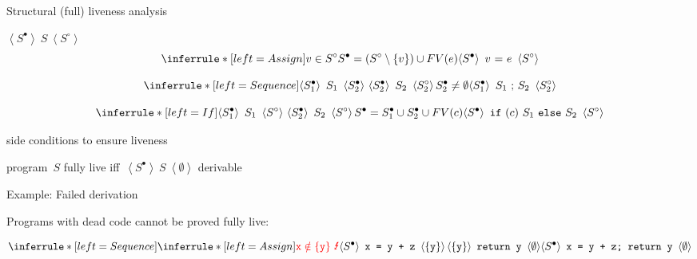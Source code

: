 \documentclass{beamer}
\newcommand{\liveout}[1]{\ensuremath{#1^{\circ}}}
\newcommand{\livein}[1]{\ensuremath{#1^{\bullet}}}
\newcommand{\triple}[3]{\ensuremath{
    \left\langle#1\right\rangle \ #2 \ \left\langle#3\right\rangle
}}
\def\union{\cup}
\begin{document}
\begin{frame}{Structural (full) liveness analysis}

 \(\triple{\livein{S}}{S}{\liveout{S}}\) \\[1em]

\pause
\[
\inferrule*[left=Assign]{
    v \in \liveout{S} \\
    \livein{S} = (\liveout{S} \setminus \{v\}) \union FV(e)
}{
    \triple{\livein{S}}{v\ \mathtt{=}\ e}{\liveout{S}}
}
\]

\pause
\[
\inferrule*[left=Sequence]{
    \triple{\livein{S_1}}{S_1}{\livein{S_2}} \\
    \triple{\livein{S_2}}{S_2}{\liveout{S_2}} \\
    \livein{S_2} \neq \emptyset
}{
    \triple{\livein{S_1}}{S_1\ \mathtt{;}\ S_2}{\liveout{S_2}}
}
\]

\[
\inferrule*[left=If]{
    \triple{\livein{S_1}}{S_1}{\liveout{S}} \\
    \triple{\livein{S_2}}{S_2}{\liveout{S}} \\
    \livein{S} = \livein{S_1} \union \livein{S_2} \union FV(c)
}{
    \triple{\livein{S}}
           {\mathtt{if\ (}c\mathtt{)}\ S_1\ \mathtt{else}\ S_2}
           {\liveout{S}}
}
\]

\pause
side conditions to ensure  liveness

program~\(S\) fully live iff~\triple{\livein{S}}{S}{\emptyset} derivable
\end{frame}


\begin{frame}{Example: Failed derivation}

Programs with dead code cannot be proved fully live:

\[
\inferrule*[left=Sequence]{
    \inferrule*[left=Assign]{
    \textcolor{red}{\mathtt{x} \notin \{\mathtt{y}\}\ \mbox{\Lightning}}
    }{\triple{\livein{S}}{\mbox{\texttt{x = y + z}}}{\{\mathtt{y}\}}}
    \\
    \triple{\{\mathtt{y}\}}{\mbox{\texttt{return y}}}{\emptyset} %
}{
\triple{\livein{S}}{\mbox{\texttt{x = y + z; return y}}}{\emptyset}
}
\]

\end{frame}
\end{document}

